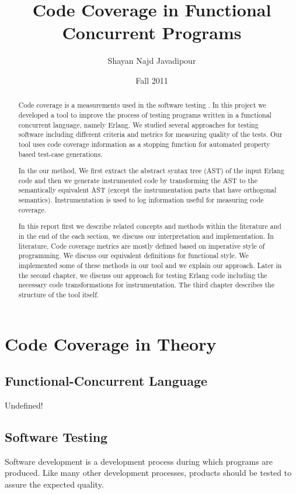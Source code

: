 \documentclass[12pt,a4paper]{report}
\title{Code Coverage in Functional Concurrent Programs}
\author{Shayan Najd Javadipour}
\date{Fall 2011}
\begin{document}
\maketitle
\begin{abstract}
Code coverage is a measurements used in the software testing . In this project we developed a tool to improve the process of testing programs written in a functional concurrent
 language, namely Erlang. We studied several approaches for testing software including different criteria and metrics for measuring quality of the tests.  Our tool uses code coverage information as
 a stopping function for automated property based test-case generations.

In the our method, We first extract the abstract syntax tree (AST) of the input Erlang code and then we generate instrumented code by transforming the
 AST to the
 semantically equivalent AST (except the instrumentation parts that have orthogonal semantics). Instrumentation is used to log information useful for
 measuring code coverage. 

In this report first we describe related concepts and methods within the literature and in the end of the each section, we discuss our interpretation
and implementation. In literature, Code coverage metrics are mostly defined based on imperative style of programming. We discuss our equivalent
 definitions for functional style. We implemented some of these methods in our tool and we explain our approach. Later in the second chapter, we
 discuss our approach for testing Erlang code including the necessary code transformations for instrumentation. The third chapter describes the
 structure of the tool itself. 
\end{abstract}
\tableofcontents
\listoffigures
\chapter{Code Coverage in Theory}
\newpage
\section{Functional-Concurrent Language}
 Undefined!
\section{Software Testing}
Software development is a development process during which programs are produced. Like many other development processes, products should be tested to
 assure the expected quality.
\end{document}
